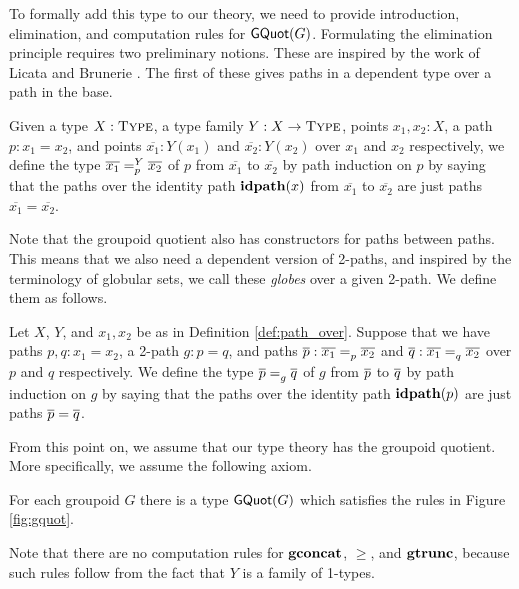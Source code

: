 To formally add this type to our theory, we need to provide
introduction, elimination, and computation rules for $\gquotType(G)$.
Formulating the elimination principle requires two preliminary notions.
These are inspired by the work of Licata and Brunerie \cite{licata2015cubical}.
The first of these gives paths in a dependent type over a path in the base.

\begin{definition}
\label{def:path_over}
Given a type $X : \Type$,
a type family $Y : \functions{X}{\Type}$,
points $x_1, x_2 : X$,
a path $p : x_1 = x_2$,
and points $\overline{x_1} : Y(x_1)$ and $\overline{x_2} : Y(x_2)$ over $x_1$ and $x_2$ respectively,
we define the type $\pathover[Y]{p}{\overline{x_1}}{\overline{x_2}}$ of  $p$ from $\overline{x_1}$ to $\overline{x_2}$ by path induction on $p$
by saying that the paths over the identity path $\refl{x}$ from $\overline{x_1}$ to $\overline{x_2}$ are just paths $\overline{x_1} = \overline{x_2}$.
\end{definition}

Note that the groupoid quotient also has constructors for paths between paths.
This means that we also need a dependent version of 2-paths,
and inspired by the terminology of globular sets, we call these \emph{globes} over a given 2-path.
We define them as follows.

\begin{definition}
\label{def:globe_over}
Let $X$, $Y$, and $x_1, x_2$ be as in Definition \ref{def:path_over}.
Suppose that we have paths $p, q : x_1 = x_2$,
a 2-path $g : p = q$,
and paths $\pover{p} : \pathover{p}{\overline{x_1}}{\overline{x_2}}$ and $\pover{q} : \pathover{q}{\overline{x_1}}{\overline{x_2}}$ over $p$ and $q$ respectively.
We define the type $\globeover{g}{\pover{p}}{\pover{q}}$ of  $g$ from $\pover{p}$ to $\pover{q}$ by path induction on $g$
by saying that the paths over the identity path $\refl{p}$ are just paths $\pover{p} = \pover{q}$.
\end{definition}

From this point on, we assume that our type theory has the groupoid quotient.
More specifically, we assume the following axiom.

\begin{axiom}
For each groupoid $G$ there is a type $\gquotType(G)$ which satisfies the rules in Figure \ref{fig:gquot}.
\end{axiom}

Note that there are no computation rules for $\gconcat$, $\ge$, and $\gtrunc$,
because such rules follow from the fact that $Y$ is a family of 1-types.

